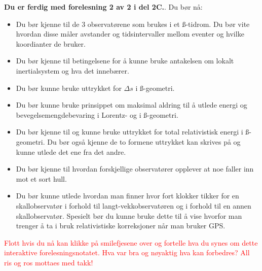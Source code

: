 \documentclass{beamer}
\let\hrefori\href
\renewcommand{\href}[2]{{\setlength{\fboxsep}{1pt}\colorbox{sunset}{\hrefori{#1}{#2}}}}
\newcommand{\pagebutton}[1]{\setbeamertemplate{button}{\tikz\node[inner xsep = 5pt, draw = structure!90, fill = green(ryb), rounded corners = 8pt]{\color{amber}\Large\insertbuttontext};}\beamerbutton{#1}}
\begin{document}
\begin{frame}
\label{oppsummering}
\hyperlink{gps20}{\pagebutton{\small Forrige side}}\href{https://nettskjema.no/a/171674}{ \Changey[1][yellow]{-2}}
\footnotesize
{\bf Du er ferdig med forelesning 2 av 2 i del 2C.}. Du bør nå:
\begin{itemize}
\item Du bør kjenne til de 3 observatørene som brukes i et \ss-tidrom. Du bør vite hvordan disse måler avstander og tidsintervaller mellom eventer og hvilke koordianter de bruker.
\item Du bør kjenne til betingelsene for å kunne bruke antakelsen om lokalt inertialsystem og hva det innebærer.
\item Du bør kunne bruke uttrykket for $\Delta s$ i \ss-geometri.
\item Du bør kunne bruke prinsippet om maksimal aldring til å utlede energi og bevegelsemengdebevaring i Lorentz- og i \ss-geometri.
\item Du bør kjenne til og kunne bruke uttrykket for total relativistisk energi i \ss-geometri. Du bør også kjenne de to formene uttrykket kan skrives på og kunne utlede det ene fra det andre.
\item Du bør kjenne til hvordan forskjellige observatører opplever at noe faller inn mot et sort hull.
\item Du bør kunne utlede hvordan man finner hvor fort klokker tikker for en skallobservatør i forhold til langt-vekkobservatøren og i forhold til en annen skallobservatør. Spesielt bør du kunne bruke dette til å vise hvorfor man trenger å ta i bruk relativistiske korreksjoner når man bruker GPS.
\end{itemize}
\textcolor{red}{Flott hvis du nå kan klikke på smilefjesene over og fortelle hva du synes om dette interaktive forelesningsnotatet. Hva var bra og nøyaktig hva kan forbedres? All ris og ros mottaes med takk!}
\end{frame}
\end{document}
